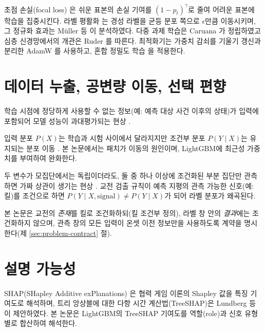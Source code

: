 초점 손실(focal loss) \cite{lin2017focal}은 쉬운 표본의 손실 기여를 $(1-p_t)^\gamma$로 줄여 어려운 표본에 학습을 집중시킨다. 라벨 평활화 \cite{szegedy2016rethinking}는 경성 라벨을 균등 분포 쪽으로 $\epsilon$만큼 이동시키며, 그 정규화 효과는 Müller 등 \cite{muller2019when}이 분석하였다. 다중 과제 학습은 Caruana \cite{caruana1997multitask}가 정립하였고 심층 신경망에서의 개관은 Ruder \cite{ruder2017overview}를 따른다. 최적화기는 가중치 감쇠를 기울기 갱신과 분리한 AdamW \cite{loshchilov2019decoupled}를 사용하고, 혼합 정밀도 학습 \cite{micikevicius2018mixed}을 적용한다.

\section{데이터 누출, 공변량 이동, 선택 편향}
\label{sec:bg-leakage}

\begin{definition}[데이터 누출]
학습 시점에 정당하게 사용할 수 없는 정보(예: 예측 대상 사건 이후의 상태)가 입력에 포함되어 모델 성능이 과대평가되는 현상 \cite{kaufman2012leakage}.
\end{definition}

\begin{definition}[공변량 이동]
입력 분포 $P(X)$는 학습과 시험 사이에서 달라지지만 조건부 분포 $P(Y \mid X)$는 유지되는 분포 이동 \cite{shimodaira2000improving,quinonero2009dataset}. 본 논문에서는 패치가 이동의 원인이며, LightGBM에 최근성 가중치를 부여하여 완화한다.
\end{definition}

\begin{definition}[Berkson의 역설]
두 변수가 모집단에서는 독립이더라도, 둘 중 하나 이상에 조건화된 부분 집단만 관측하면 가짜 상관이 생기는 현상 \cite{berkson1946limitations}. 교전 검출 규칙이 예측 지평의 관측 가능한 신호(예: 킬)를 조건으로 하면 $P(Y\mid X, \text{signal}) \ne P(Y \mid X)$가 되어 라벨 분포가 왜곡된다.
\end{definition}

본 논문은 교전의 \emph{존재}를 킬로 조건화하되(킬 조건부 정의), 라벨 창 안의 \emph{결과}에는 조건화하지 않으며, 관측 창의 모든 입력이 온셋 이전 정보만을 사용하도록 계약을 명시한다(제 \ref{sec:problem-contract} 절).

\section{설명 가능성}
\label{sec:bg-shap}

SHAP(SHapley Additive exPlanations) \cite{lundberg2017unified}은 협력 게임 이론의 Shapley 값을 특징 기여도로 해석하며, 트리 앙상블에 대한 다항 시간 계산법(TreeSHAP)은 Lundberg 등 \cite{lundberg2020local}이 제안하였다. 본 논문은 LightGBM의 TreeSHAP 기여도를 역할(role)과 신호 유형별로 합산하여 해석한다.

